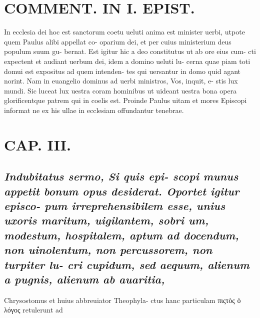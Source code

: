 \documentclass{article}
\begin{document}
\begin{pages}
\section*{COMMENT. IN I. EPIST. }\pstart In ecclesia dei hoc est sanctorum coetu ueluti anima est minister uerbi, utpote quem Paulus alibi appellat co- oparium dei, et per cuius ministerium deus populum suum gu- bernat. Est igitur hic a deo constitutus ut ab ore eius cum- cti expectent et audiant uerbum dei, idem a domino ueluti lu- cerna quae piam toti domui est expositus ad quem intenden- tes qui uersantur in domo quid agant norint. Nam in euangelio dominus ad uerbi ministros, Vos, inquit, e- stis lux mundi. Sic luceat lux uestra coram hominibus ut uideant uestra bona opera glorificentque patrem qui in coelis est. Proinde Paulus uitam et mores Episcopi informat ne ex his ullae in ecclesiam offundantur tenebrae.  \pend
\endnumbering\beginnumbering\section{CAP. III.}
{}
\subsection*{\textit{Indubitatus sermo, Si quis epi- scopi munus appetit bonum opus desiderat. Oportet igitur episco- pum irreprehensibilem esse, unius uxoris maritum, uigilantem, sobri um, modestum, hospitalem, aptum ad docendum, non uinolentum, non percussorem, non turpiter lu- cri cupidum, sed aequum, alienum a pugnis, alienum ab auaritia, }}\pstart Chrysostomus et huius abbreuiator Theophyla- ctus hanc particulam πιςτὸς ὁ λόγος retulerunt ad  \pend

\end{pages}
\end{document}
